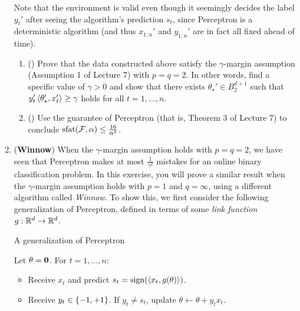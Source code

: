 \documentclass{article}
\begin{document}
\begin{enumerate}[leftmargin=*,align=left]
Note that the environment is valid even though it seemingly decides the label $y_t'$ after seeing the algorithm's prediction $s_t$, since Perceptron is a deterministic algorithm (and thus $x_{1:n}'$ and $y_{1:n}'$ are in fact all fixed ahead of time).

\begin{enumerate}[leftmargin=*,align=left]

\vspace{5pt}
\item () 
Prove that the data constructed above satisfy the $\gamma$-margin assumption (Assumption 1 of Lecture 7) with $p=q=2$.
In other words, find a specific value of $\gamma >0$ and show that there exists $\theta_\star' \in B_2^{d+1}$ such that $y_t'\left\langle \theta_\star',x_t' \right\rangle \geq \gamma$ holds for all $t = 1, \ldots, n$. \\


\vspace{5pt}
\item () 
Use the guarantee of Perceptron (that is, Theorem 3 of Lecture 7) to conclude ${\text{\rm sfat}}({\mathcal{F}}, \alpha) \leq \frac{16}{\alpha^2}$.  \\

\end{enumerate}

\newpage
\item 
({\bf Winnow})
When the $\gamma$-margin assumption holds with $p=q=2$, we have seen that Perceptron makes at most $\frac{1}{\gamma^2}$ mistakes for an online binary classification problem.
In this exercise, you will prove a similar result when the $\gamma$-margin assumption holds with $p=1$ and $q=\infty$, using a different algorithm called {\it Winnow}.
To show this, we first consider the following generalization of Perceptron, defined in terms of some \textit{link function} $g: \mathbb{R}^d \rightarrow \mathbb{R}^d$.

\begin{minipage}{\linewidth}
\begin{algorithm}[H]
\caption{A generalization of Perceptron}
\label{alg:generalized_Perceptron}
Let $\theta = {\boldsymbol{0}}$. For $t = 1, \ldots, n$:
\begin{itemize}
\item Receive $x_t$ and predict $s_t = {\text{\rm sign}}(\left\langle x_t,g(\theta) \right\rangle)$.
\item Receive $y_t\in\left\{-1,+1\right\}$. If $y_t \neq s_t$, update $\theta \leftarrow \theta + y_t x_t$.
\end{itemize}
\end{algorithm}
\end{minipage}


\end{enumerate}
\end{document}
